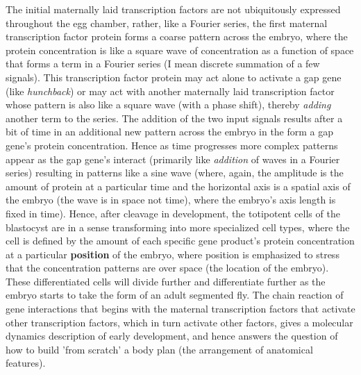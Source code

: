 The initial maternally laid transcription factors are not ubiquitously expressed throughout the egg chamber, rather, like a Fourier series, the first maternal transcription factor protein forms a coarse pattern across the embryo, where the protein concentration is like a square wave of concentration as a function of space that forms a term in a Fourier series (I mean discrete summation of a few signals).  This transcription factor protein may act alone to activate a gap gene (like \textit{hunchback}) or may act with another maternally laid transcription factor whose pattern is also like a square wave (with a phase shift), thereby \textit{adding} another term to the series.  The addition of the two input signals results after a bit of time in an additional new pattern across the embryo in the form a gap gene's protein concentration.  Hence as time progresses more complex patterns appear as the gap gene's interact (primarily like \textit{addition} of waves in a Fourier series) resulting in patterns like a sine wave (where, again, the amplitude is the amount of protein at a particular time and the horizontal axis is a spatial axis of the embryo (the wave is in space not time), where the embryo's axis length is fixed in time).  Hence, after cleavage in development, the totipotent cells of the blastocyst are in a sense transforming into more specialized cell types, where the cell is defined by the amount of each specific gene product's protein concentration at a particular \textbf{position} of the embryo, where position is emphasized to stress that the concentration patterns are over space (the location of the embryo).  These differentiated cells will divide further and differentiate further as the embryo starts to take the form of an adult segmented fly.  The chain reaction of gene interactions that begins with the maternal transcription factors that activate other transcription factors, which in turn activate other factors, gives a molecular dynamics description of early development, and hence answers the question of how to build 'from scratch' a body plan (the arrangement of anatomical features).  

